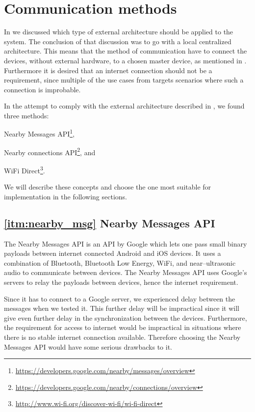 \section{Communication methods}\label{sec:communication_methods}
In  we discussed which type of external architecture should be applied to the system.
The conclusion of that discussion was to go with a local centralized architecture.
This means that the method of communication have to connect the devices, without external hardware, to a chosen master device, as mentioned in .
Furthermore it is desired that an internet connection should not be a requirement, since multiple of the use cases from  targets scenarios where such a connection is improbable.

In the attempt to comply with the external architecture described in , we found three methods:
\begin{enumberate*}
\item Nearby Messages API\footnote{\url{https://developers.google.com/nearby/messages/overview}}, \label{itm:nearby_msg}
\item Nearby connections API\footnote{\url{https://developers.google.com/nearby/connections/overview}}, and \label{itm:nearby_conn}
\item WiFi Direct\footnote{\url{http://www.wi-fi.org/discover-wi-fi/wi-fi-direct}}. \label{itm:wifi_direct}
\end{enumberate*}
We will describe these concepts and choose the one most suitable for implementation in the following sections.

\subsection*{\ref{itm:nearby_msg} Nearby Messages API}
The Nearby Messages API is an API by Google which lets one pass small binary payloads between internet connected Android and iOS devices.
It uses a combination of Bluetooth, Bluetooth Low Energy, WiFi, and near--ultrasonic audio to communicate between devices.
The Nearby Messages API uses Google's servers to relay the payloads between devices, hence the internet requirement.\cite{nearby_messages}

Since it has to connect to a Google server, we experienced delay between the messages when we tested it.
This further delay will be impractical since it will give even further delay in the synchronization between the devices.
Furthermore, the requirement for access to internet would be impractical in situations where there is no stable internet connection available.
Therefore choosing the Nearby Messages API would have some serious drawbacks to it.

